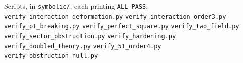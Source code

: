 \documentclass[11pt]{article}
\theoremstyle{definition}
\theoremstyle{remark}
\begin{document}
Scripts, in \texttt{symbolic/}, each printing \texttt{ALL PASS}:\\
\texttt{verify\_interaction\_deformation.py} \quad
\texttt{verify\_interaction\_order3.py}\\
\texttt{verify\_pt\_breaking.py} \quad
\texttt{verify\_perfect\_square.py} \quad
\texttt{verify\_two\_field.py}\\
\texttt{verify\_sector\_obstruction.py} \quad
\texttt{verify\_hardening.py}\\
\texttt{verify\_doubled\_theory.py} \quad
\texttt{verify\_51\_order4.py}\\
\texttt{verify\_obstruction\_null.py}
\end{document}

